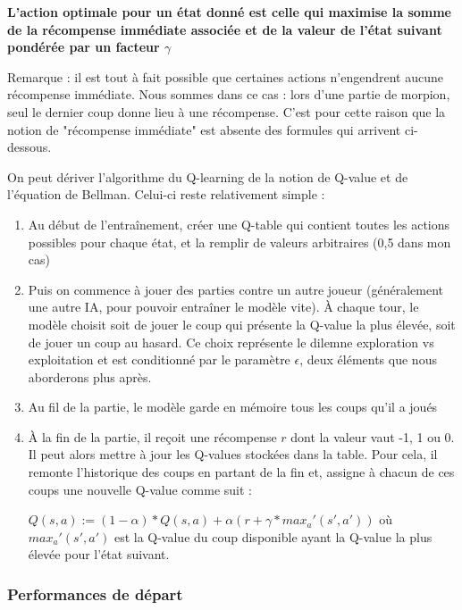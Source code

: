 \documentclass[french]{article}
\begin{document}
    {\centering \textbf{L'action optimale pour un état donné est celle qui maximise la somme de la récompense immédiate associée et de la valeur de l'état suivant pondérée par un facteur $\gamma$}}
    

    Remarque : il est tout à fait possible que certaines actions n'engendrent aucune récompense immédiate. Nous sommes dans ce cas : lors d'une partie de morpion, seul le dernier coup donne lieu à une récompense. C'est pour cette raison que la notion de "récompense immédiate" est absente des formules qui arrivent ci-dessous.
    
    On peut dériver l'algorithme du Q-learning de la notion de Q-value et de l'équation de Bellman. Celui-ci reste relativement simple :
    \begin{enumerate}
        \item Au début de l'entraînement, créer une Q-table qui contient toutes les actions possibles pour chaque état, et la remplir de valeurs arbitraires (0,5 dans mon cas)
        \item Puis on commence à jouer des parties contre un autre joueur (généralement une autre IA, pour pouvoir entraîner le modèle vite). À chaque tour, le modèle choisit soit de jouer le coup qui présente la Q-value la plus élevée, soit de jouer un coup au hasard. Ce choix représente le dilemne exploration vs exploitation et est conditionné par le paramètre $\epsilon$, deux éléments que nous aborderons plus après. 
        \item Au fil de la partie, le modèle garde en mémoire tous les coups qu'il a joués
        \item À la fin de la partie, il reçoit une récompense $r$ dont la valeur vaut -1, 1 ou 0. Il peut alors mettre à jour les Q-values stockées dans la table. Pour cela, il remonte l'historique des coups en partant de la fin et, assigne à chacun de ces coups une nouvelle Q-value comme suit :

        {\centering $Q(s,a) := (1-\alpha)*Q(s,a) + \alpha(r + \gamma * max_a'(s',a')) $}
        où $max_a'(s',a')$ est la Q-value du coup disponible ayant la Q-value la plus élevée pour l'état suivant.
        
    \end{enumerate}


    \subsubsection{Performances de départ}
\end{document}
